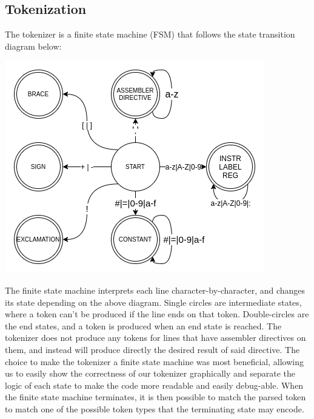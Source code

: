 \documentclass[11pt]{article}
\begin{document}
\subsection*{Tokenization}
The tokenizer is a finite state machine (FSM) that follows the state transition diagram below:
\begin{center}
	\includegraphics[scale=0.6]{fsmDiagram}
\end{center}
The finite state machine interprets each line character-by-character, and changes its state depending on the above diagram. Single circles are intermediate states, where a token can't be produced if the line ends on that token. Double-circles are the end states, and a token is produced when an end state is reached. The tokenizer does not produce any tokens for lines that have assembler directives on them, and instead will produce directly the desired result of said directive.
The choice to make the tokenizer a finite state machine was most beneficial, allowing us to easily show the correctness of our tokenizer graphically and separate the logic of each state to make the code more readable and easily debug-able.  
When the finite state machine terminates, it is then possible to match the parsed token to match one of the possible token types that the terminating state may encode. 
\end{document}
